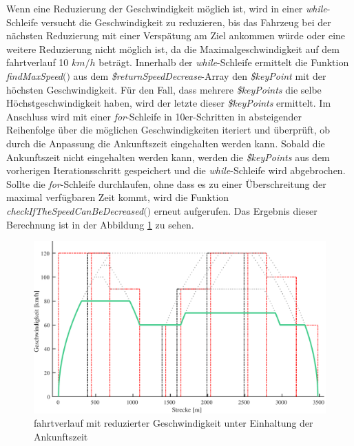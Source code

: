 Wenn eine Reduzierung der Geschwindigkeit möglich ist, wird in einer \textit{while}-Schleife versucht die Geschwindigkeit zu reduzieren, bis das Fahrzeug bei der nächsten Reduzierung mit einer Verspätung am Ziel ankommen würde oder eine weitere Reduzierung nicht möglich ist, da die Maximalgeschwindigkeit auf dem \Gls{fahrtverlauf} 10 $km/h$ beträgt. Innerhalb der \textit{while}-Schleife ermittelt die Funktion \textit{findMaxSpeed$($$)$} aus dem \textit{\$returnSpeedDecrease}-Array den \textit{\$keyPoint} mit der höchsten Geschwindigkeit. Für den Fall, dass mehrere \textit{\$keyPoints} die selbe Höchstgeschwindigkeit haben, wird der letzte dieser \textit{\$keyPoints} ermittelt. Im Anschluss wird mit einer \textit{for}-Schleife in 10er-Schritten in absteigender Reihenfolge über die möglichen Geschwindigkeiten iteriert und überprüft, ob durch die Anpassung die Ankunftszeit eingehalten werden kann. Sobald die Ankunftszeit nicht eingehalten werden kann, werden die \textit{\$keyPoints} aus dem vorherigen Iterationsschritt gespeichert und die \textit{while}-Schleife wird abgebrochen. Sollte die \textit{for}-Schleife durchlaufen, ohne dass es zu einer Überschreitung der maximal verfügbaren Zeit kommt, wird die Funktion \textit{checkIfTheSpeedCanBeDecreased$($$)$} erneut aufgerufen. 
Das Ergebnis dieser Berechnung ist in der Abbildung \ref{fig:it10} zu sehen.
\begin{figure}
\includegraphics[width=\linewidth]{../images/matlab/it10.pdf}
\caption{\Gls{fahrtverlauf} mit reduzierter Geschwindigkeit unter Einhaltung der Ankunftszeit}
\label{fig:it10}
\end{figure}
